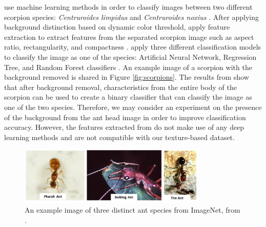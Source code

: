 \documentclass[12pt]{article}
\begin{document}
\citeauthor*{urteaga_scorpions_2016} use machine learning methods in order to
classify images between two different scorpion species: \textit{Centruroides
    limpidus} and \textit{Centruroides noxius} \cite{urteaga_scorpions_2016}. After
applying background distinction based on dynamic color threshold,
\citeauthor*{urteaga_scorpions_2016} apply feature extraction to extract
features from the separated scorpion image such as aspect ratio, rectangularity,
and compactness \cite{urteaga_scorpions_2016}.
\citeauthor*{urteaga_scorpions_2016} apply three different classification models
to classify the image as one of the species: Artificial Neural Network,
Regression Tree, and Random Forest classifiers \cite{urteaga_scorpions_2016}. An
example image of a scorpion with the background removed is shared in Figure
\ref{fig:scorpions}. The results from \citeauthor*{urteaga_scorpions_2016} show
that after background removal, characteristics from the entire body of the
scorpion can be used to create a binary classifier that can classify the image
as one of the two species. Therefore, we may consider an experiment on the
presence of the background from the ant head image in order to improve
classification accuracy. However, the features extracted from
\cite{urteaga_scorpions_2016} do not make use of any deep learning methods and
are not compatible with our texture-based dataset.
\newpage

\begin{figure}[h]
    \centering
    \includegraphics[width=0.8\textwidth]{assets/images/imagenet_ants.png}
    \caption{An example image of three distinct ant species from ImageNet, from
        \citeauthor*{glick_insect_2016} \cite{glick_insect_2016}.}
    \label{fig:imagenet-ants}
\end{figure}
\end{document}
